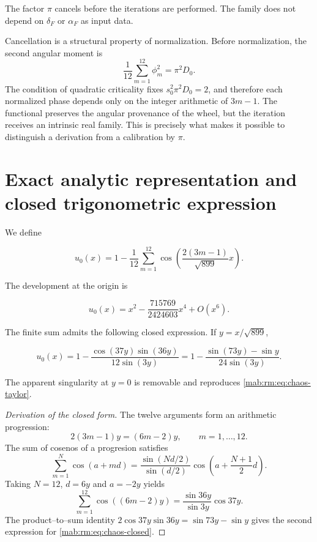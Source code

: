 The factor \(\pi\) cancels before the iterations are performed. The family does not
depend on \(\delta_F\) or \(\alpha_F\) as input data.

Cancellation is a structural property of
normalization. Before normalization, the second angular moment
is
\[
\frac1{12}\sum_{m=1}^{12}\phi_m^2
=\pi^2D_0.
\]
The condition of quadratic criticality fixes
\(s_0^2\pi^2D_0=2\), and therefore each normalized phase depends only on the
integer arithmetic of \(3m-1\). The functional preserves the angular provenance of
the wheel, but the iteration receives an intrinsic real family. This is
precisely what makes it possible to distinguish a derivation from a calibration
by \(\pi\).

\section{Exact analytic representation and closed trigonometric expression}

We define

\begin{equation}
u_0(x)=1-\frac1{12}\sum_{m=1}^{12}
\cos\!\left(\frac{2(3m-1)}{\sqrt{899}}x\right).
\label{mab:rm:eq:chaos-profile}
\end{equation}

The development at the origin is

\begin{equation}
u_0(x)=x^2-\frac{715769}{2424603}x^4+O(x^6).
\label{mab:rm:eq:chaos-taylor}
\end{equation}

The finite sum admits the following closed expression. If \(y=x/\sqrt{899}\),

\begin{equation}
u_0(x)=1-\frac{\cos(37y)\sin(36y)}{12\sin(3y)}
=1-\frac{\sin(73y)-\sin y}{24\sin(3y)}.
\label{mab:rm:eq:chaos-closed}
\end{equation}

The apparent singularity at \(y=0\) is removable and reproduces \cref{mab:rm:eq:chaos-taylor}.

\begin{proof}[Derivation of the closed form]
The twelve arguments form an arithmetic progression:
\[
2(3m-1)y=(6m-2)y,\qquad m=1,\ldots,12.
\]
The sum of cosenos of a progresion satisfies
\[
\sum_{m=1}^{N}\cos(a+md)
=\frac{\sin(Nd/2)}{\sin(d/2)}
 \cos\!\left(a+\frac{N+1}{2}d\right).
\]
Taking \(N=12\), \(d=6y\) and \(a=-2y\) yields
\[
\sum_{m=1}^{12}\cos((6m-2)y)
=\frac{\sin36y}{\sin3y}\cos37y.
\]
The product--to--sum identity
\(2\cos37y\sin36y=\sin73y-\sin y\) gives the second expression for
\cref{mab:rm:eq:chaos-closed}.
\end{proof}

